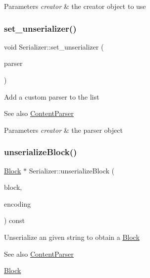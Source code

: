 \begin{DoxyParams}{Parameters}
{\em creator} & the creator object to use \\
\hline
\end{DoxyParams}
\mbox{\label{classSerializer_a74ea868b820b4a8472da98c0045418fa}} 
\subsubsection{\texorpdfstring{set\+\_\+unserializer()}{set\_unserializer()}}
{\footnotesize\ttfamily void Serializer\+::set\+\_\+unserializer (\begin{DoxyParamCaption}\item[{\mbox{\hyperlink{classContentParser}{Content\+Parser}} $\ast$}]{parser }\end{DoxyParamCaption})}

Add a custom parser to the list \begin{DoxySeeAlso}{See also}
\mbox{\hyperlink{classContentParser}{Content\+Parser}}
\end{DoxySeeAlso}

\begin{DoxyParams}{Parameters}
{\em creator} & the parser object \\
\hline
\end{DoxyParams}
\mbox{\label{classSerializer_a423fb7c43ca9c23e07000dba0c5a432a}} 
\subsubsection{\texorpdfstring{unserialize\+Block()}{unserializeBlock()}}
{\footnotesize\ttfamily \mbox{\hyperlink{classBlock}{Block}} $\ast$ Serializer\+::unserialize\+Block (\begin{DoxyParamCaption}\item[{std\+::string}]{block,  }\item[{const char $\ast$}]{encoding }\end{DoxyParamCaption}) const\hspace{0.3cm}{\ttfamily [virtual]}}

Unserialize an given string to obtain a \mbox{\hyperlink{classBlock}{Block}} \begin{DoxySeeAlso}{See also}
\mbox{\hyperlink{classContentParser}{Content\+Parser}} 

\mbox{\hyperlink{classBlock}{Block}}
\end{DoxySeeAlso}

